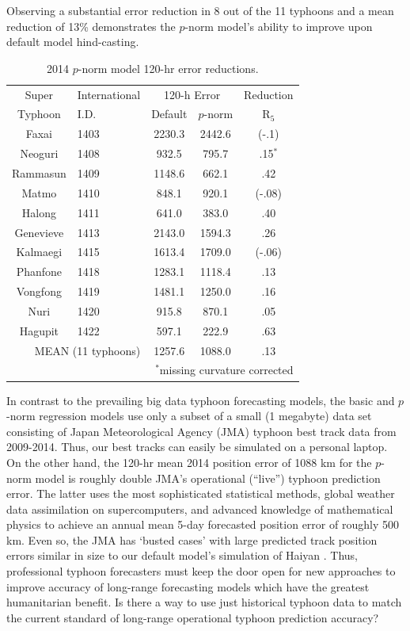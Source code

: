 \documentclass{SBCbookchapter}
\begin{document}
 {\flushleft Observing} a substantial error reduction in 8 out of the 11 typhoons and a mean reduction of 13\% demonstrates the $p$-norm model's ability to improve upon default model hind-casting.
\begin{table}[!htpb]
\scriptsize
\centering
   \begin{tabular}{|c|l||c|c|c|}\hline
 Super& International&\multicolumn{2}{|c|}{120-h Error}& Reduction\\
      Typhoon  & I.D. &Default & $p$-norm & R$_5$\\\hline
 Faxai&1403&2230.3&2442.6&(-.1)\\\hline
 Neoguri& 1408&932.5&795.7&.15$^*$\\\hline
 Rammasun &1409&1148.6&662.1  &.42\\\hline
 Matmo& 1410&848.1&920.1&(-.08)\\\hline
 Halong  & 1411&641.0 &383.0& .40\\\hline
 Genevieve  & 1413&2143.0 &1594.3& .26\\\hline
 Kalmaegi&1415&1613.4 &1709.0& (-.06)\\\hline
 Phanfone   & 1418&1283.1 &1118.4& .13\\\hline
 Vongfong &  1419&1481.1 &1250.0&.16\\\hline
 Nuri & 1420&915.8 & 870.1&.05\\\hline
 Hagupit& 1422&597.1&222.9&.63\\\hline\hline
\multicolumn{2}{|r|}{MEAN (11 typhoons)}&1257.6 &  1088.0& .13 \\\hline
\multicolumn{5}{r}{$^*${\tiny missing curvature corrected}}
  \end{tabular}
  \caption{  2014 $p$-norm model 120-hr error reductions.}
  \label{typ5}
 \end{table}

In contrast to the prevailing big data typhoon forecasting models, the basic and $p$-norm regression models use only a subset of a small (1 megabyte) data set consisting of Japan Meteorological Agency (JMA) typhoon best track data from 2009-2014. Thus, our best tracks can easily be simulated on a personal laptop. On the other hand, the 120-hr mean 2014 position error of 1088 km for the $p$-norm model is roughly double JMA's operational (``live'') typhoon prediction error. The latter uses the most sophisticated statistical methods, global weather data assimilation on supercomputers, and advanced knowledge of mathematical physics to achieve an annual mean 5-day forecasted position error of roughly 500 km. Even so,  the JMA  has `busted cases'  with large predicted track position errors similar in size to our default model's simulation of Haiyan \cite{Ito}. Thus, professional typhoon forecasters must keep the door open for new approaches to improve accuracy of long-range forecasting models which have the greatest humanitarian benefit. Is there a way to use just historical typhoon data to match the current standard of long-range operational typhoon prediction accuracy?
\end{document}

